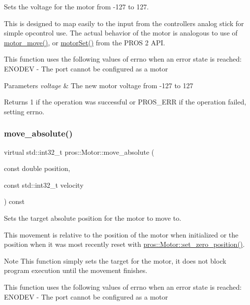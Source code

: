 Sets the voltage for the motor from -\/127 to 127. 

This is designed to map easily to the input from the controller\textquotesingle{}s analog stick for simple opcontrol use. The actual behavior of the motor is analogous to use of \hyperlink{motors_8h_a7da9bf1e229e50bfeeaecf026a6d0d08}{motor\+\_\+move()}, or \hyperlink{api__legacy_8h_a59a0d6bd050cd259ad488e68f856ae81}{motor\+Set()} from the P\+R\+OS 2 A\+PI.

This function uses the following values of errno when an error state is reached\+: E\+N\+O\+D\+EV -\/ The port cannot be configured as a motor


\begin{DoxyParams}{Parameters}
{\em voltage} & The new motor voltage from -\/127 to 127\\
\hline
\end{DoxyParams}
\begin{DoxyReturn}{Returns}
1 if the operation was successful or P\+R\+O\+S\+\_\+\+E\+RR if the operation failed, setting errno. 
\end{DoxyReturn}
\mbox{\label{classpros_1_1Motor_a7851ffa40c9803d75398a5be355de395}} 
\subsubsection{\texorpdfstring{move\+\_\+absolute()}{move\_absolute()}}
{\footnotesize\ttfamily virtual std\+::int32\+\_\+t pros\+::\+Motor\+::move\+\_\+absolute (\begin{DoxyParamCaption}\item[{const double}]{position,  }\item[{const std\+::int32\+\_\+t}]{velocity }\end{DoxyParamCaption}) const\hspace{0.3cm}{\ttfamily [virtual]}}



Sets the target absolute position for the motor to move to. 

This movement is relative to the position of the motor when initialized or the position when it was most recently reset with \hyperlink{classpros_1_1Motor_af20c036c1d5d68eb5e762c12f9a4b7fe}{pros\+::\+Motor\+::set\+\_\+zero\+\_\+position()}.

\begin{DoxyNote}{Note}
This function simply sets the target for the motor, it does not block program execution until the movement finishes.
\end{DoxyNote}
This function uses the following values of errno when an error state is reached\+: E\+N\+O\+D\+EV -\/ The port cannot be configured as a motor


